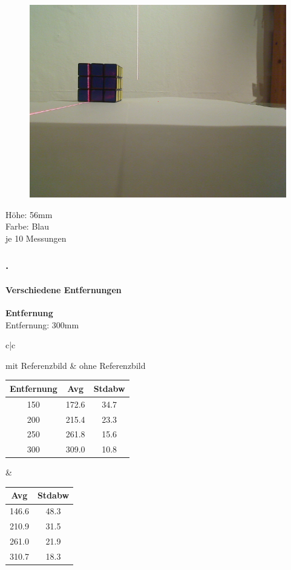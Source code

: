 \documentclass[xcolor=dvipsnames]{beamer}
\def\frametitlesec{\frametitle{\arabic{section}.\hspace{0.5ex}\insertsection}}
\def\framesubtitles#1{\framesubtitle{\hspace{3.5ex}#1}}
\begin{document}
\begin{frame}
\begin{figure}
\begin{minipage}{0.32\linewidth}
		\end{minipage}
		\hfill
		\begin{minipage}{0.32\linewidth}
			\includegraphics[width=\linewidth]{includes/test_dist_3}
		\end{minipage}
	\end{figure}
	Höhe: 56mm\\
	Farbe: Blau\\
	je 10 Messungen
	
\end{frame}

\begin{frame}
	\frametitlesec
	\framesubtitles{Verschiedene Entfernungen}
		\textbf{Entfernung}\\
		
		
		Entfernung: 300mm
		
		\begin{tabular}{c|c}
		
		mit Referenzbild & ohne Referenzbild\\
		
		\begin{tabular}{c|c|c}
Entfernung & Avg & Stdabw\\ \hline
150 &      172.6 & 34.7\\
200 &      215.4 & 23.3\\
250 &      261.8 & 15.6\\
300 &      309.0 & 10.8\\

		\end{tabular}
		&
		\begin{tabular}{c|c}
Avg   & Stdabw\\ \hline
146.6 & 48.3\\
210.9 & 31.5\\
261.0 & 21.9\\
310.7 & 18.3\\
		\end{tabular}
		
		\end{tabular}
		
		
\end{frame}
\end{document}
